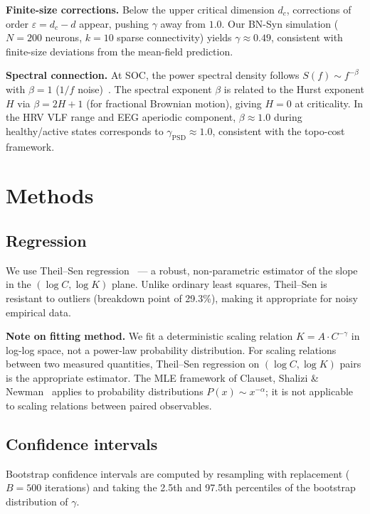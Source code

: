 \documentclass[11pt,a4paper,twocolumn]{article}
\begin{document}
\textbf{Finite-size corrections.} Below the upper critical dimension $d_c$, corrections of order $\varepsilon = d_c - d$ appear, pushing $\gamma$ away from $1.0$. Our BN-Syn simulation ($N\!=\!200$ neurons, $k\!=\!10$ sparse connectivity) yields $\gamma \approx 0.49$, consistent with finite-size deviations from the mean-field prediction.

\textbf{Spectral connection.} At SOC, the power spectral density follows $S(f) \sim f^{-\beta}$ with $\beta = 1$ ($1/f$ noise)~\cite{bak1987}. The spectral exponent $\beta$ is related to the Hurst exponent $H$ via $\beta = 2H + 1$ (for fractional Brownian motion), giving $H = 0$ at criticality. In the HRV VLF range and EEG aperiodic component, $\beta \approx 1.0$ during healthy/active states corresponds to $\gamma_{\text{PSD}} \approx 1.0$, consistent with the topo-cost framework.

\section{Methods}

\subsection{Regression}

We use Theil--Sen regression~\cite{theil1950} --- a robust, non-parametric estimator of the slope in the $(\log C, \log K)$ plane. Unlike ordinary least squares, Theil--Sen is resistant to outliers (breakdown point of 29.3\%), making it appropriate for noisy empirical data.

\textbf{Note on fitting method.} We fit a deterministic scaling relation $K = A \cdot C^{-\gamma}$ in log-log space, not a power-law probability distribution. For scaling relations between two measured quantities, Theil--Sen regression on $(\log C, \log K)$ pairs is the appropriate estimator. The MLE framework of Clauset, Shalizi \& Newman~\cite{clauset2009} applies to probability distributions $P(x) \sim x^{-\alpha}$; it is not applicable to scaling relations between paired observables.

\subsection{Confidence intervals}

Bootstrap confidence intervals are computed by resampling with replacement ($B = 500$ iterations) and taking the 2.5th and 97.5th percentiles of the bootstrap distribution of $\gamma$.
\end{document}
